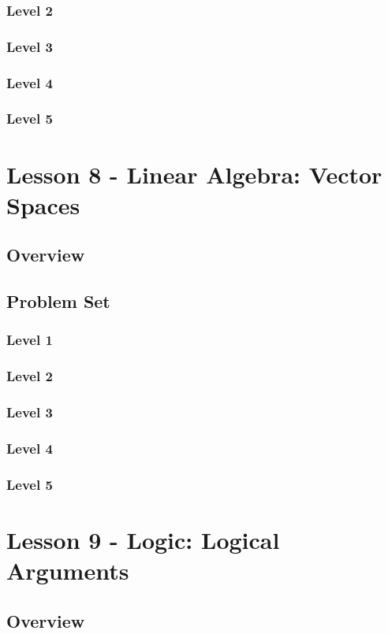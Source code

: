 \documentclass{article}
\begin{document}
\subsubsection{Level 2}
\subsubsection{Level 3}
\subsubsection{Level 4}
\subsubsection{Level 5}
\pagebreak

\section{Lesson 8 - Linear Algebra: Vector Spaces}
\subsection{Overview}
\subsection{Problem Set}
\subsubsection{Level 1}
\subsubsection{Level 2}
\subsubsection{Level 3}
\subsubsection{Level 4}
\subsubsection{Level 5}
\pagebreak

\section{Lesson 9 - Logic: Logical Arguments}
\subsection{Overview}
\end{document}

